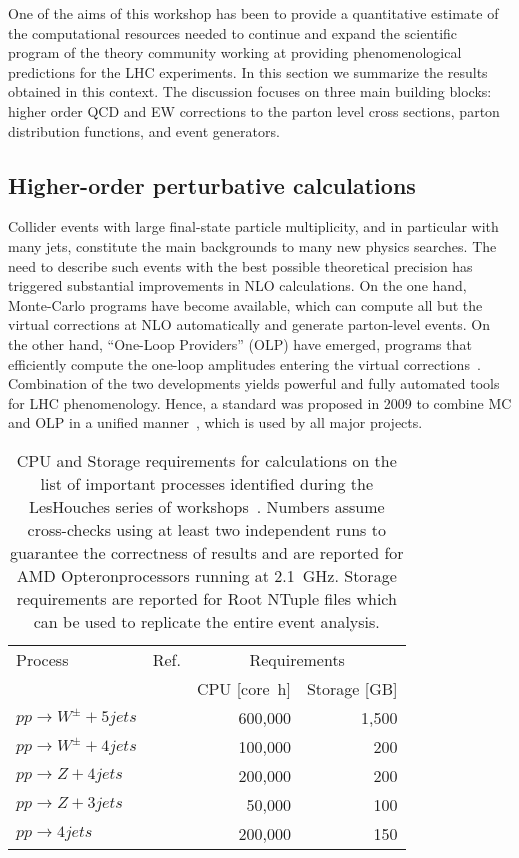 One of the aims of this workshop has been to provide a
quantitative estimate of the computational resources needed to
continue and expand the scientific program of the theory community
working at providing phenomenological predictions for the LHC
experiments. In this section we summarize the results obtained in
this context. The discussion focuses on three main building
blocks: higher order QCD and EW corrections to the parton level
cross sections, parton distribution functions, and event generators.

\subsection{Higher-order perturbative calculations}
\label{sec:nlo}

Collider events with large final-state particle multiplicity, and in particular 
with many jets, constitute the main backgrounds to many new physics searches.  
The need to describe such events with the best possible theoretical precision
has triggered substantial improvements in NLO calculations. 
On the one hand, Monte-Carlo programs have become available, which can compute 
all but the virtual corrections at NLO automatically and generate parton-level events. 
On the other hand, ``One-Loop Providers'' (OLP) have emerged, programs that 
efficiently compute the one-loop amplitudes entering the virtual corrections~\cite{
Berger:2008sj,Hahn:2000jm,Cullen:2011ac,Hirschi:2011pa,Cascioli:2011va,Reina:2011mb}. 
Combination of the two developments yields powerful and fully automated tools 
for LHC phenomenology. Hence, a standard was proposed in 2009 to combine MC and OLP 
in a unified manner~\cite{Binoth:2010xt}, which is used by all major projects.

\begin{table}
  \centering
  \begin{tabular}{llrr}
    \hline
    Process & Ref. & \multicolumn{2}{c}{Requirements}\\
    & & CPU [core~h] & Storage [GB] \\
    \hline\hline
    $pp\to W^\pm+5 jets$ & \cite{Bern:2013gka} & 600,000 & 1,500 \\
    $pp\to W^\pm+4 jets$ & \cite{Berger:2010zx} & 100,000 & 200\\
    $pp\to Z+4 jets$ & \cite{Ita:2011wn} & 200,000 & 200\\
    $pp\to Z+3 jets$ & \cite{Berger:2010vm} & 50,000 & 100 \\
    $pp\to 4 jets$ & \cite{Bern:2011ep} & 200,000 & 150\\
    \hline
  \end{tabular}
  \caption{CPU and Storage requirements for calculations on the
    list of important processes identified during the LesHouches
    series of workshops~\cite{AlcarazMaestre:2012vp}.
    Numbers assume cross-checks using at least
    two independent runs to guarantee the correctness of results
    and are reported for AMD Opteron\trademark processors running at 2.1~GHz.
    Storage requirements are reported for Root NTuple files which can be used
    to replicate the entire event analysis.
  \label{tab:nlo_wishlist}}
\end{table}

